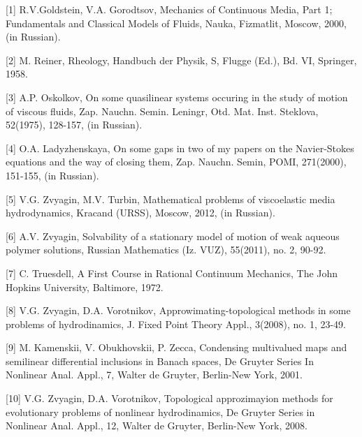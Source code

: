 [1] R.V.Goldstein, V.A. Gorodtsov, Mechanics of Continuous Media, Part 1; Fundamentals and
Classical Models of Fluids, Nauka, Fizmatlit, Moscow, 2000, (in Russian).

[2] M. Reiner, Rheology, Handbuch der Physik, S, Flugge (Ed.), Bd. VI, Springer, 1958.

[3] A.P. Oskolkov, On some quasilinear systems occuring in the study of motion of viscous fluids,
Zap. Nauchn. Semin. Leningr, Otd. Mat. Inst. Steklova, 52(1975), 128-157, (in Russian).

[4] O.A. Ladyzhenskaya, On some gaps in two of my papers on the Navier-Stokes equations and
the way of closing them, Zap. Nauchn. Semin, POMI, 271(2000), 151-155, (in Russian).

[5] V.G. Zvyagin, M.V. Turbin, Mathematical problems of viscoelastic media hydrodynamics, Kracand (URSS), 
Moscow, 2012, (in Russian).

[6] A.V. Zvyagin, Solvability of a stationary model of motion of weak aqueous polymer solutions,
Russian Mathematics (Iz. VUZ), 55(2011), no. 2, 90-92.

[7] C. Truesdell, A First Course in Rational Continuum Mechanics, The John Hopkins University,
Baltimore, 1972.

[8] V.G. Zvyagin, D.A. Vorotnikov, Approwimating-topological methods in some problems of hydrodinamics, 
J. Fixed Point Theory Appl., 3(2008), no. 1, 23-49.

[9] M. Kamenskii, V. Obukhovskii, P. Zecca, Condensing multivalued maps and semilinear differential 
inclusions in Banach spaces, De Gruyter Series In Nonlinear Anal. Appl., 7, Walter de Gruyter, Berlin-New York, 2001.

[10] V.G. Zvyagin, D.A. Vorotnikov, Topological approzimayion methods for evolutionary problems
of nonlinear hydrodinamics, De Gruyter Series in Nonlinear Anal. Appl., 12, Walter de Gruyter, Berlin-New York, 2008.

